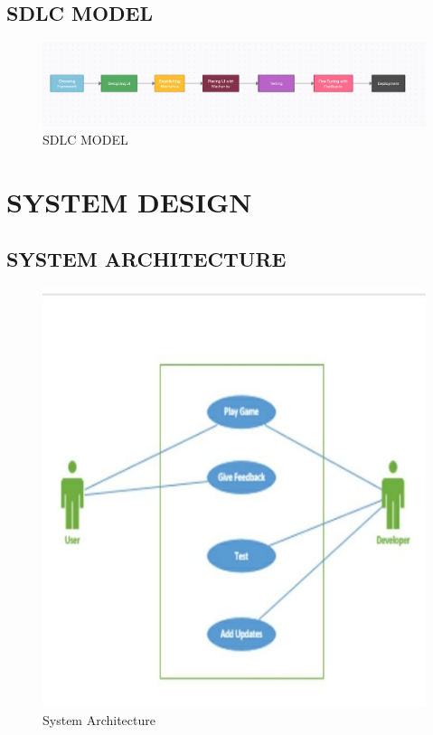 \documentclass[12pt]{report}
\begin{document}
\subsection{ SDLC MODEL}
\vspace{2cm}
\begin{figure}[h]
\centering
\includegraphics[scale=0.9]{SDLC.png}
\caption{SDLC MODEL}
\label{SDLC}
\end{figure}
\clearpage


\centering
\section{ SYSTEM DESIGN}
\raggedright
\subsection{SYSTEM ARCHITECTURE}

\justifying
\setlength{\parindent}{4em}
\setlength{\parskip}{0.5em}
\renewcommand{\baselinestretch}{1.5}

\vspace{0.5cm}
\begin{figure}[h]
\centering
\includegraphics[scale=0.7]{Architecture.png}
\caption{ System Architecture}
\label{ System Architecture}
\end{figure}
\vspace{0.1cm}
\end{document}
